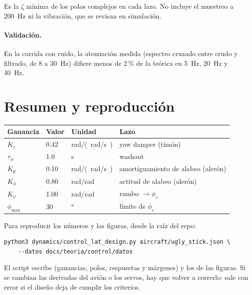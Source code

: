 \documentclass[11pt,a4paper]{article}
\begin{document}
Es la $\zeta$ mínima de los polos complejos en cada lazo. No incluye el
muestreo a \SI{200}{Hz} ni la vibración, que se revisan en simulación.

\paragraph{Validación.} En la corrida con ruido, la atenuación medida (espectro
cruzado entre crudo y filtrado, de 8 a \SI{30}{Hz}) difiere menos de 2\,\% de la
teórica en \SI{5}{Hz}, \SI{20}{Hz} y \SI{40}{Hz}.

\section{Resumen y reproducción}

\begin{center}
\begin{tabular}{llll}
\toprule
Ganancia & Valor & Unidad & Lazo \\
\midrule
$K_r$          & 0.42 & \si{rad/(rad/s)} & yaw damper (timón) \\
$\tau_w$       & 1.0  & \si{s}           & washout \\
$K_p$          & 0.10 & \si{rad/(rad/s)} & amortiguamiento de alabeo (alerón) \\
$K_\phi$       & 0.80 & \si{rad/rad}     & actitud de alabeo (alerón) \\
$K_\psi$       & 1.00 & \si{rad/rad}     & rumbo $\rightarrow \phi_c$ \\
$\phi_{\max}$  & 30   & \si{\degree}     & límite de $\phi_c$ \\
\bottomrule
\end{tabular}
\end{center}

Para reproducir los números y las figuras, desde la raíz del repo:
\begin{lstlisting}
python3 dynamics/control_lat_design.py aircraft/ugly_stick.json \
    --datos docs/teoria/control/datos
\end{lstlisting}
El script escribe  (ganancias,
polos, respuestas y márgenes) y los \archivo{.dat} de las figuras. Si se
cambian las derivadas del avión o los servos, hay que volver a correrlo: sale
con error si el diseño deja de cumplir los criterios.

\end{document}
